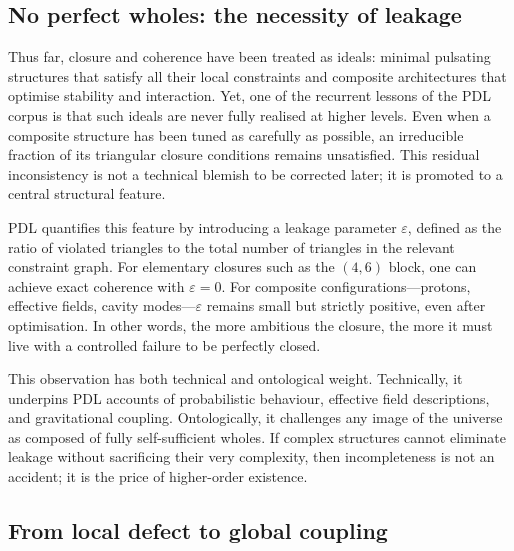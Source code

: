 \documentclass[11pt,a4paper]{article}
\theoremstyle{definition}
\begin{document}
\subsection{No perfect wholes: the necessity of leakage}

Thus far, closure and coherence have been treated as ideals: minimal pulsating structures that satisfy all their local constraints and composite architectures that optimise stability and interaction. Yet, one of the recurrent lessons of the PDL corpus is that such ideals are never fully realised at higher levels. Even when a composite structure has been tuned as carefully as possible, an irreducible fraction of its triangular closure conditions remains unsatisfied.\cite{Laubscher_Leakage_Probability_2024,Laubscher_Exponent18_v2_2024,Laubscher_PDL_Position_2024} This residual inconsistency is not a technical blemish to be corrected later; it is promoted to a central structural feature.

PDL quantifies this feature by introducing a leakage parameter \(\varepsilon\), defined as the ratio of violated triangles to the total number of triangles in the relevant constraint graph.\cite{Laubscher_Leakage_Probability_2024} For elementary closures such as the \((4,6)\) block, one can achieve exact coherence with \(\varepsilon = 0\).\cite{Laubscher_MinimalClosures_46_2024} For composite configurations---protons, effective fields, cavity modes---\(\varepsilon\) remains small but strictly positive, even after optimisation.\cite{Laubscher_ProtonArch_v2_2024,Laubscher_EffectiveFields_2024,Laubscher_CavityModes_PDL_2024} In other words, the more ambitious the closure, the more it must live with a controlled failure to be perfectly closed.

This observation has both technical and ontological weight. Technically, it underpins PDL accounts of probabilistic behaviour, effective field descriptions, and gravitational coupling.\cite{Laubscher_Leakage_Probability_2024,Laubscher_EffectiveFields_2024,Laubscher_UniversalCoherenceLeakage_2024} Ontologically, it challenges any image of the universe as composed of fully self-sufficient wholes. If complex structures cannot eliminate leakage without sacrificing their very complexity, then incompleteness is not an accident; it is the price of higher-order existence.

\subsection{From local defect to global coupling}
\end{document}
